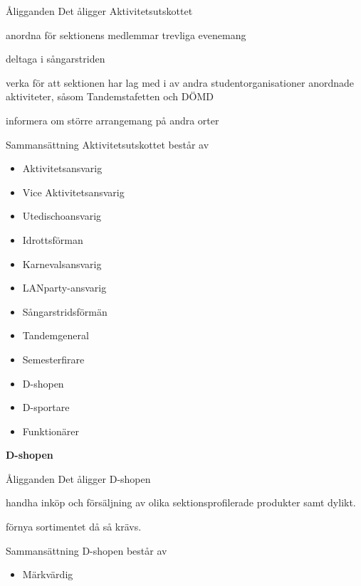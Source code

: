 \documentclass[pdfbookmarks,a4paper,11pt]{article}
\newlength{\itemcollength}
\newenvironment{reglemlista}{%
  \begin{list}{}{%
      \setlength{\labelwidth}{\itemcollength}%
      \setlength{\leftmargin}{\labelwidth + \labelsep}%
      \renewcommand{\makelabel}[1]{%
        \raisebox{0pt}[1ex][0pt]{%
          \makebox[\labelwidth][l]{%
            \parbox[t]{\itemcollength}{%
              \raggedright\hspace{0pt}##1}}}\hfill}%
      }}{%
  \end{list}}
\begin{document}
\begin{reglemlista}

	\item[Åligganden]
	Det åligger Aktivitetsutskottet
	\begin{attlista}
		\item anordna för sektionens medlemmar trevliga evenemang
		\item deltaga i sångarstriden
		\item verka för att sektionen har lag med i av andra studentorganisationer anordnade aktiviteter, såsom Tandemstafetten och DÖMD
		\item informera om större arrangemang på andra orter
	\end{attlista}

	\item[Sammansättning]
	Aktivitetsutskottet består av
	\begin{itemize}
		\item Aktivitetsansvarig
		\item Vice Aktivitetsansvarig
		\item Utedischoansvarig
		\item Idrottsförman
		\item Karnevalsansvarig
		\item LANparty-ansvarig
		\item Sångarstridsförmän
		\item Tandemgeneral
		\item Semesterfirare
		\item D-shopen
		\item D-sportare
		\item Funktionärer
	\end{itemize}


	\item[\textbf{D-shopen}]

	\item[Åligganden]
	Det åligger D-shopen
	\begin{attlista}
		\item handha inköp och försäljning av olika sektionsprofilerade produkter samt dylikt.
		\item förnya sortimentet då så krävs.
	\end{attlista}
	\item[Sammansättning]
	D-shopen består av
	\begin{itemize}
		\item Märkvärdig
	\end{itemize}
\end{reglemlista}
\end{document}
